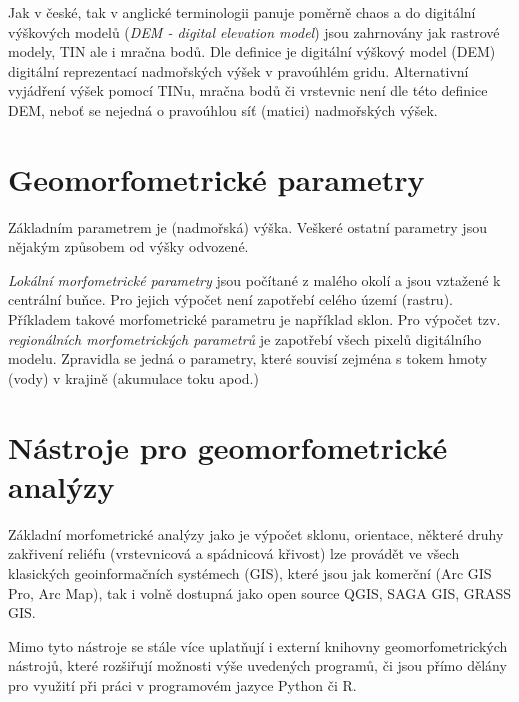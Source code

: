 Jak v české, tak v anglické terminologii panuje poměrně chaos a do digitální výškových modelů (\textit{DEM - digital elevation model}) jsou zahrnovány jak rastrové modely, TIN ale i mračna bodů. Dle definice \textcite{guthDigitalElevationModels2021} je digitální výškový model (DEM) digitální reprezentací nadmořských výšek v pravoúhlém gridu. Alternativní vyjádření výšek pomocí TINu, mračna bodů či vrstevnic není dle této definice DEM, neboť se nejedná o pravoúhlou síť (matici) nadmořských výšek.

	 


\section{Geomorfometrické parametry}
Základním parametrem je (nadmořská) výška. Veškeré ostatní parametry jsou nějakým způsobem od výšky odvozené.  

\emph{Lokální morfometrické parametry} jsou počítané z malého okolí a jsou vztažené k centrální buňce. Pro jejich výpočet není zapotřebí celého území (rastru). Příkladem takové morfometrické parametru je například sklon.
Pro výpočet tzv. \emph{regionálních morfometrických parametrů} je zapotřebí všech pixelů digitálního modelu. Zpravidla se jedná o parametry, které souvisí zejména s tokem hmoty (vody) v krajině (akumulace toku apod.)  

\section{Nástroje pro geomorfometrické analýzy}
Základní morfometrické analýzy jako je výpočet sklonu, orientace, některé druhy zakřivení reliéfu (vrstevnicová a spádnicová křivost) lze provádět ve všech klasických geoinformačních systémech (GIS), které jsou jak komerční (Arc GIS Pro, Arc Map), tak i volně dostupná jako open source QGIS, SAGA GIS, GRASS GIS.  

Mimo tyto nástroje se stále více uplatňují i externí knihovny geomorfometrických nástrojů, které rozšiřují možnosti výše uvedených programů, či jsou přímo dělány pro využití při práci v programovém jazyce Python či R.

 